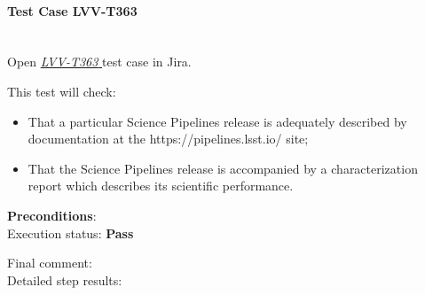 \documentclass[DM,lsstdraft,STR,toc]{lsstdoc}
\providecommand{\tightlist}{
  \setlength{\itemsep}{0pt}\setlength{\parskip}{0pt}}
\begin{document}
    \paragraph{Test Case LVV-T363 }\mbox{}\\

Open  \href{https://jira.lsstcorp.org/secure/Tests.jspa#/testCase/LVV-T363}{\textit{ LVV-T363 } }
test case in Jira.

    This test will check:

\begin{itemize}
\tightlist
\item
  That a particular Science Pipelines release is adequately described by
  documentation at the https://pipelines.lsst.io/ site;
\item
  That the Science Pipelines release is accompanied by a
  characterization report which describes its scientific performance.
\end{itemize}


    {\bf Preconditions}:\\
    

    Execution status: {\bf Pass }

    Final comment:\\


    Detailed step results:
\end{document}
